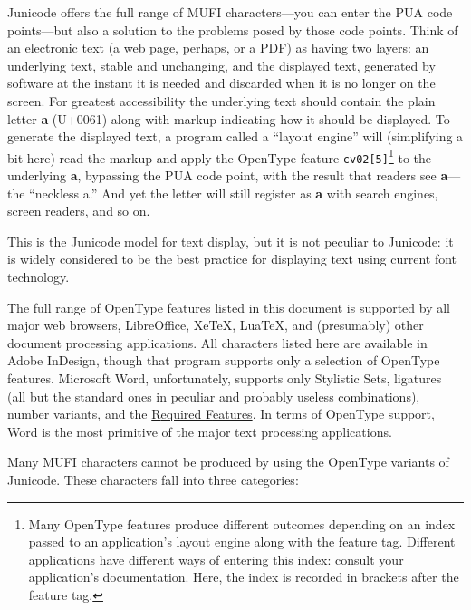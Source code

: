 \documentclass[letterpaper,12pt]{article}
\newcommand\textLetterExample[1]{\textrm{\textbf{#1}}}
\newcommand\textSourceText[1]{\texttt{#1}}
\newcommand{\cvd}[3][0]{{\addfontfeature{CharacterVariant=#2:#1}#3}}
\begin{document}
Junicode offers the full range of MUFI characters---you can enter the PUA code points---but also a solution to the
problems posed by those code points. Think of an electronic text (a web page, perhaps, or a PDF) as having two layers:
an underlying text, stable and unchanging, and the displayed text, generated by software at the instant it is needed
and discarded when it is no longer on the screen. For greatest accessibility the underlying text should contain the
plain letter \textLetterExample{a} (U+0061) along with markup indicating how it should be displayed. To generate
the displayed text, a program called a ``layout engine'' will (simplifying a bit here) read the markup and apply the
OpenType feature \textSourceText{cv02[5]}\footnote{Many OpenType features produce different outcomes depending on
an index passed to an application's layout engine along with the feature tag. Different applications have different
ways of entering this index: consult your application's documentation. Here, the index is recorded in brackets after
the feature tag.\par } to the underlying \textLetterExample{a}, bypassing the PUA code point, with the result that
readers see \textLetterExample{\cvd[4]{2}{a}}{}---the ``neckless a.'' And yet the letter will still register as
\textLetterExample{a} with search engines, screen readers, and so on.

This is the Junicode model for text display, but it is not peculiar to Junicode: it is widely considered to be the best
practice for displaying text using current font technology.

The full range of OpenType features listed in this document is supported by all major web browsers, LibreOffice, XeTeX,
LuaTeX, and (presumably) other document processing applications. All characters listed here are available in Adobe
InDesign, though that program supports only a selection of OpenType features. Microsoft Word, unfortunately, supports
only Stylistic Sets, ligatures (all but the standard ones in peculiar and probably useless combinations), number
variants, and the \hyperlink{req}{R}\hyperlink{req}{equired }\hyperlink{req}{F}\hyperlink{req}{eatures}. In terms of
OpenType support, Word is the most primitive of the major text processing applications.

Many MUFI characters cannot be produced by using the OpenType variants of Junicode. These characters fall into three
categories:
\end{document}
